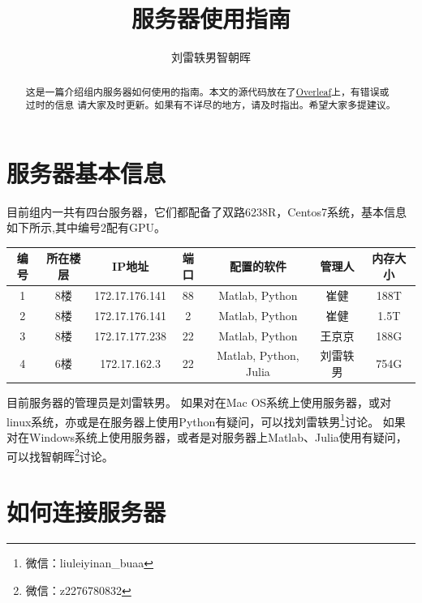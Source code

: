 \documentclass{article}
\begin{document}
\title{服务器使用指南}
\author{刘雷轶男\quad 智朝晖}
\maketitle

\begin{abstract}
这是一篇介绍组内服务器如何使用的指南。本文的源代码放在了\href{https://www.overleaf.com/}{Overleaf}上，有错误或过时的信息
请大家及时更新。如果有不详尽的地方，请及时指出。希望大家多提建议。
\end{abstract}
\newpage

\tableofcontents
\newpage

\section{服务器基本信息}
目前组内一共有四台服务器，它们都配备了双路6238R，Centos7系统，基本信息如下所示,其中编号2配有GPU。

\begin{table}[H]\label{info}
    \centering
    \begin{tabular}{|c|c|c|c|c|c|c|}
    \hline
    编号 & 所在楼层 & IP地址           & 端口 & 配置的软件          & 管理人  & 内存大小    \\ \hline
    1  & 8楼   & 172.17.176.141 & 88 & Matlab, Python & 崔健    & 188T \\ \hline
    2  & 8楼   & 172.17.176.141 & 2  & Matlab, Python & 崔健    & 1.5T \\ \hline
    3  & 8楼   & 172.17.177.238 & 22 & Matlab, Python & 王京京  &  188G    \\ \hline
    4  & 6楼   & 172.17.162.3   & 22 & Matlab, Python, Julia  & 刘雷轶男 & 754G \\ \hline
    \end{tabular}
\end{table}

目前服务器的管理员是刘雷轶男。
如果对在Mac OS系统上使用服务器，或对linux系统，亦或是在服务器上使用Python有疑问，可以找刘雷轶男\footnote{微信：liuleiyinan\_buaa}讨论。
如果对在Windows系统上使用服务器，或者是对服务器上Matlab、Julia使用有疑问，可以找智朝晖\footnote{微信：z2276780832}讨论。

\section{如何连接服务器}
\end{document}
